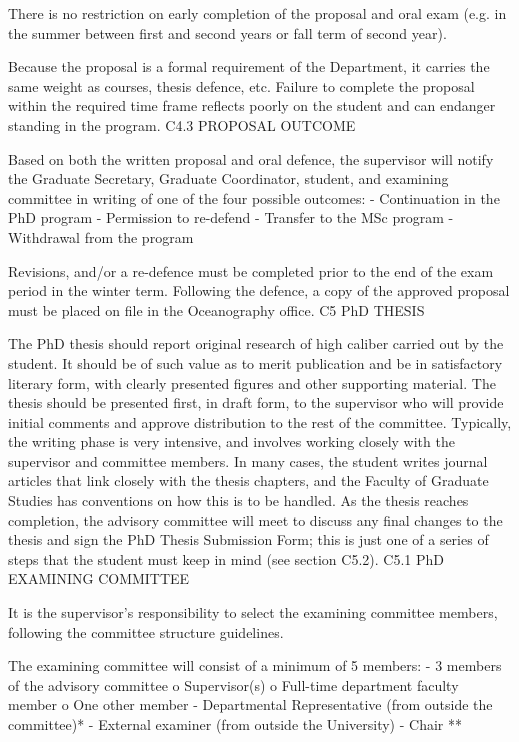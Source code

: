 \documentclass{article}
\begin{document}
There is no restriction on early completion of the proposal and oral exam (e.g. in the summer between first and second years or fall term of second year).

Because the proposal is a formal requirement of the Department, it carries the same weight as courses, thesis defence, etc. Failure to complete the proposal within the required time frame reflects poorly on the student and can endanger standing in the program.
C4.3	PROPOSAL OUTCOME

Based on both the written proposal and oral defence, the supervisor will notify the Graduate Secretary, Graduate Coordinator, student, and examining committee in writing of one of the four possible outcomes:
-	Continuation in the PhD program
-	Permission to re-defend
-	Transfer to the MSc program
-	Withdrawal from the program

Revisions, and/or a re-defence must be completed prior to the end of the exam period in the winter term. Following the defence, a copy of the approved proposal must be placed on file in the Oceanography office.
C5	PhD THESIS

The PhD thesis should report original research of high caliber carried out by the student. It should be of such value as to merit publication and be in satisfactory literary form, with clearly presented figures and other supporting material. The thesis should be presented first, in draft form, to the supervisor who will provide initial comments and approve distribution to the rest of the committee. Typically, the writing phase is very intensive, and involves working closely with the supervisor and committee members. In many cases, the student writes journal articles that link closely with the thesis chapters, and the Faculty of Graduate Studies has conventions on how this is to be handled. As the thesis reaches completion, the advisory committee will meet to discuss any final changes to the thesis and sign the PhD Thesis Submission Form; this is just one of a series of steps that the student must keep in mind (see section C5.2).
C5.1	PhD EXAMINING COMMITTEE
 

It is the supervisor’s responsibility to select the examining committee members, following the committee structure guidelines.

The examining committee will consist of a minimum of 5 members:
-	3 members of the advisory committee
o	Supervisor(s)
o	Full-time department faculty member
o	One other member
-	Departmental Representative (from outside the committee)*
-	External examiner (from outside the University)
-	Chair **
\end{document}
